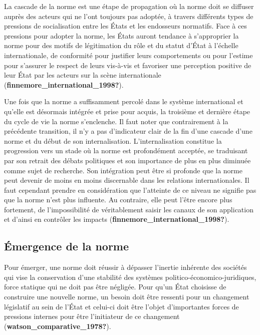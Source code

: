 \documentclass[12pt]{ulaval}
\begin{document}
La cascade de la norme est une étape de propagation où la norme doit se diffuser auprès des acteurs qui ne l'ont toujours pas adoptée, à travers différents types de pressions de socialisation entre les États et les endosseurs normatifs. Face à ces pressions pour adopter la norme, les États auront tendance à s'approprier la norme pour des motifs de légitimation du rôle et du statut d'État à l'échelle internationale, de conformité pour justifier leurs comportements ou pour l'estime pour s'assurer le respect de leurs vis-à-vis et favoriser une perception positive de leur État par les acteurs sur la scène internationale (\textbf{finnemore\_international\_1998?}).

Une fois que la norme a suffisamment percolé dans le système international et qu'elle est désormais intégrée et prise pour acquis, la troisième et dernière étape du cycle de vie la norme s'enclenche. Il faut noter que contrairement à la précédente transition, il n'y a pas d'indicateur clair de la fin d'une cascade d'une norme et du début de son internalisation. L'internalisation constitue la progression vers un stade où la norme est profondément acceptée, se traduisant par son retrait des débats politiques et son importance de plus en plus diminuée comme sujet de recherche. Son intégration peut être si profonde que la norme peut devenir de moins en moins discernable dans les relations internationales. Il faut cependant prendre en considération que l'atteinte de ce niveau ne signifie pas que la norme n'est plus influente. Au contraire, elle peut l'être encore plus fortement, de l'impossibilité de véritablement saisir les canaux de son application et d'ainsi en contrôler les impacts (\textbf{finnemore\_international\_1998?}).

\subsection{Émergence de la norme}\label{uxe9mergence-de-la-norme}

Pour émerger, une norme doit réussir à dépasser l'inertie inhérente des sociétés qui vise la conservation d'une stabilité des systèmes politico-économico-juridiques, force statique qui ne doit pas être négligée. Pour qu'un État choisisse de construire une nouvelle norme, un besoin doit être ressenti pour un changement législatif au sein de l'État et celui-ci doit être l'objet d'importantes forces de pressions internes pour être l'initiateur de ce changement (\textbf{watson\_comparative\_1978?}).
\end{document}
